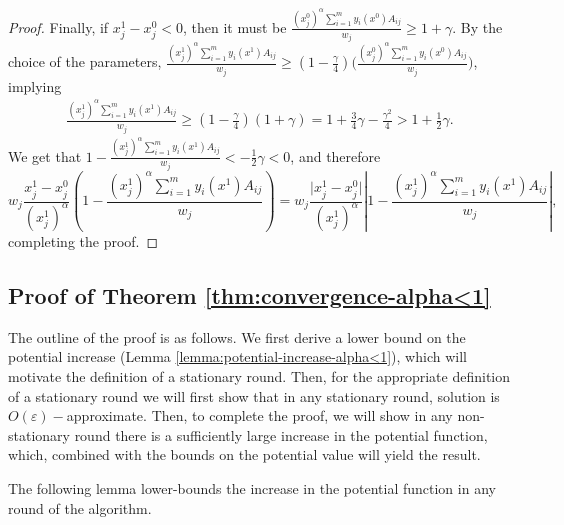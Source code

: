 \documentclass[11pt]{article}
\newif\iffullpaper
\begin{document}
\begin{proof}
Finally, if $x_j^1-x_j^0<0$, then it must be $\frac{(x_j^0)^{\alpha}\sum_{i=1}^my_i(x^0)A_{ij}}{w_j}\geq 1+\gamma$. By the choice of the parameters, $\frac{(x_j^1)^{\alpha}\sum_{i=1}^my_i(x^1)A_{ij}}{w_j}\geq \left(1-\frac{\gamma}{4}\right)\Big(\frac{(x_j^0)^{\alpha}\sum_{i=1}^my_i(x^0)A_{ij}}{w_j}\Big)$, implying
\begin{align}
\frac{(x_j^1)^{\alpha}\sum_{i=1}^my_i(x^1)A_{ij}}{w_j}\geq \left(1-\frac{\gamma}{4}\right)(1+\gamma) = 1 + \frac{3}{4}\gamma - \frac{\gamma^2}{4}
>1 + \frac{1}{2}\gamma. \label{eq:alpha<1-zj-decrease}
\end{align}
We get that $1 - \frac{(x_j^1)^{\alpha}\sum_{i=1}^my_i(x^1)A_{ij}}{w_j}<-\frac{1}{2}\gamma<0$, and therefore 
\begin{equation*}
w_j \frac{x_j^1 - x_j^0}{(x_j^1)^{\alpha}}\left(1 - \frac{(x_j^1)^{\alpha}\sum_{i=1}^my_i(x^1)A_{ij}}{w_j} \right) = w_j \frac{\big|x_j^1 - x_j^0\big|}{(x_j^1)^{\alpha}}\left|1 - \frac{(x_j^1)^{\alpha}\sum_{i=1}^my_i(x^1)A_{ij}}{w_j} \right|,
\end{equation*}
completing the proof.
\end{proof}
\fi

\iffullpaper
\subsection{Proof of Theorem \ref{thm:convergence-alpha<1}}\label{section:alpha<1}

The outline of the proof is as follows. We first derive a lower bound on the potential increase (Lemma \ref{lemma:potential-increase-alpha<1}), which will motivate the definition of a stationary round. Then, for the appropriate definition of a stationary round we will first show that in any stationary round, solution is $O(\varepsilon)-$approximate. Then, to complete the proof, we will show in any non-stationary round there is a sufficiently large increase in the potential function, which, combined with the bounds on the potential value will yield the result.

The following lemma lower-bounds the increase in the potential function in any round of the algorithm. 
\end{document}
